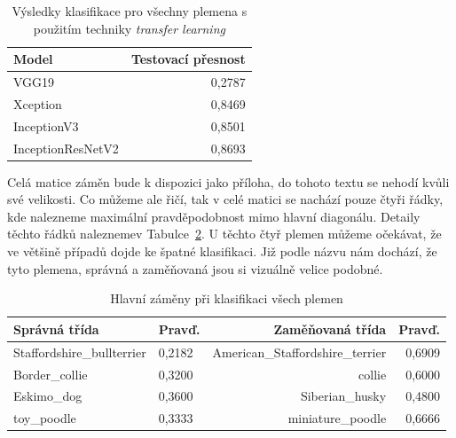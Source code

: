 \documentclass[a4paper,12pt]{article}
\begin{document}
\begin{table}[h!]
    \centering
    \begin{tabular}{l | r }
    \toprule
    Model               & Testovací přesnost  \\\midrule
    VGG19               & 0,2787              \\
    Xception            & 0,8469              \\
    InceptionV3         & 0,8501              \\
    InceptionResNetV2   & 0,8693              \\
    \bottomrule
    \end{tabular}
    \caption{Výsledky klasifikace pro všechny plemena s použitím techniky \emph{transfer learning}}
    \label{tab:transfered_results}
\end{table}

Celá matice záměn bude k dispozici jako příloha, do tohoto textu se nehodí kvůli své velikosti. Co můžeme ale řičí, tak v celé matici se nachází pouze čtyři řádky, kde nalezneme maximální pravděpodobnost mimo hlavní diagonálu. Detaily těchto řádků nalezneme\linebreak v Tabulce~\ref{tab:confmat_mismatch}. U těchto čtyř plemen můžeme očekávat, že ve většině případů dojde ke špatné klasifikaci. Již podle názvu nám dochází, že tyto plemena, správná a zaměňovaná jsou si vizuálně velice podobné.

\begin{table}[h!]
    \centering
    \begin{tabular}{l | l | r | r }
    \toprule
    Správná třída                & Pravď.   & Zaměňovaná třída                            & Pravď. \\\midrule
    Staffordshire\_bullterrier   & 0,2182   & American\_Staffordshire\_terrier      & 0,6909            \\
    Border\_collie               & 0,3200   & collie                                & 0,6000            \\
    Eskimo\_dog                  & 0,3600   & Siberian\_husky                       & 0,4800            \\
    toy\_poodle                  & 0,3333   & miniature\_poodle                     & 0,6666            \\
    \bottomrule
    \end{tabular}
    \caption{Hlavní záměny při klasifikaci všech plemen}
    \label{tab:confmat_mismatch}
\end{table}
\end{document}
